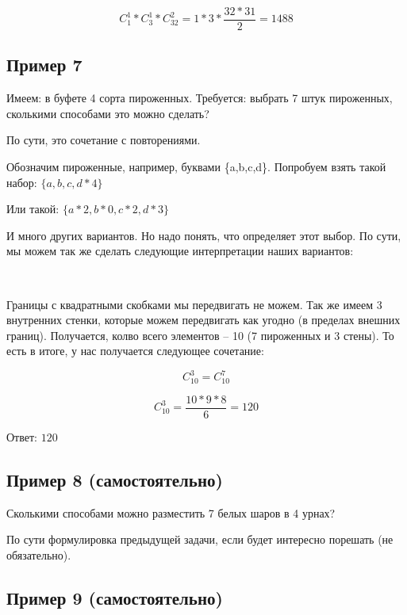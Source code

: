 \documentclass{article}
\begin{document}
$$ C_1^1 * C_3^1 * C_32^2 = 1 * 3 * \frac{32 * 31}{2} = 1488$$

\subsection{Пример 7}

Имеем: в буфете 4 сорта пироженных.
Требуется: выбрать 7 штук пироженных, сколькими способами это можно сделать?

По сути, это сочетание с повторениями.

Обозначим пироженные, например, буквами \{a,b,c,d\}. Попробуем взять такой набор: $\{a, b, c, d * 4\}$

Или такой: $\{a * 2, b * 0, c * 2, d * 3\}$

И много других вариантов. Но надо понять, что определяет этот выбор. По сути, мы можем так же сделать следующие интерпретации наших вариантов:

\begin{center}
\begin{tabbing}
\qquad\qquad\qquad\qquad[\quad*\quad|\quad*\quad|\quad*\quad|\quad****\quad]\\

\qquad\qquad\qquad\qquad[\quad**\quad|\qquad|\quad**\quad|\quad***\quad]
\end{tabbing}
\end{center}

Границы с квадратными скобками мы передвигать не можем. Так же имеем 3 внутренних стенки, которые можем передвигать как угодно (в пределах внешних границ). Получается, колво всего элементов -- 10 (7 пироженных и 3 стены). То есть в итоге, у нас получается следующее сочетание:

$$C_{10}^3 = C_{10}^7$$

$$C_{10}^3 = \frac{10 * 9 * 8}{6} = 120$$

Ответ: $120$

\subsection{Пример 8 (самостоятельно)}

Сколькими способами можно разместить 7 белых шаров в 4 урнах?

По сути формулировка предыдущей задачи, если будет интересно порешать (не обязательно).

\subsection{Пример 9 (самостоятельно)}
\end{document}
